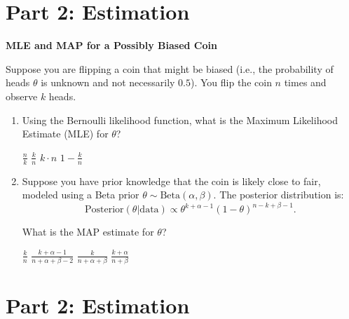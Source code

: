 \documentclass[12pt,letterpaper, onecolumn]{exam}
\begin{document}
\begin{questions}
\clearpage
\section*{Part 2: Estimation}

\question[10 points]\textbf{MLE and MAP for a Possibly Biased Coin}\droppoints

Suppose you are flipping a coin that might be biased (i.e., the probability of heads \( \theta \) is unknown and not necessarily \( 0.5 \)). You flip the coin \( n \) times and observe \( k \) heads.

\begin{enumerate}[label=(\alph*)]
    \item Using the Bernoulli likelihood function, what is the Maximum Likelihood Estimate (MLE) for \( \theta \)?
    \begin{choices}
        \choice \( \frac{n}{k} \)
        \choice \( \frac{k}{n} \)
        \choice \( k \cdot n \)
        \choice \( 1 - \frac{k}{n} \)
    \end{choices}
    \item Suppose you have prior knowledge that the coin is likely close to fair, modeled using a Beta prior \( \theta \sim \text{Beta}(\alpha, \beta) \). The posterior distribution is:
    \[
    \text{Posterior}(\theta | \text{data}) \propto \theta^{k + \alpha - 1} (1 - \theta)^{n - k + \beta - 1}.
    \]

    What is the MAP estimate for \( \theta \)?
    \begin{choices}
        \choice \( \frac{k}{n} \)
        \choice \( \frac{k + \alpha - 1}{n + \alpha + \beta - 2} \)
        \choice \( \frac{k}{n + \alpha + \beta} \)
        \choice \( \frac{k + \alpha}{n + \beta} \)
    \end{choices}
\end{enumerate}

\begin{solution}
    \begin{parts}
        \part 
        \part  
    \end{parts}
\end{solution}


\section*{Part 2: Estimation}


\end{questions}
\end{document}
